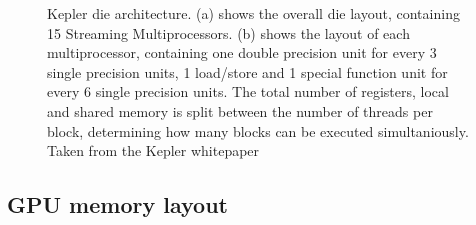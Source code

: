\begin{figure}[ht!]
\begin{mdframed}
\begin{subfigure}[b]{0.6\textwidth}
    \caption{}
  \end{subfigure}
  \caption[Kepler architecture]{Kepler die architecture. (a) shows the overall die layout, containing 15 Streaming Multiprocessors. (b) shows the layout of each multiprocessor, containing one double precision unit for every 
				3 single precision units, 1 load/store and 1 special function unit for every 6 single precision units. The total number of registers, local and shared memory is split between the number of threads per 
				block, determining how many blocks can be executed simultaniously. Taken from the Kepler whitepaper \cite{kepler}}
  \label{fig_kepler_arch}
 \end{mdframed}
\end{figure}
\subsection{GPU memory layout}